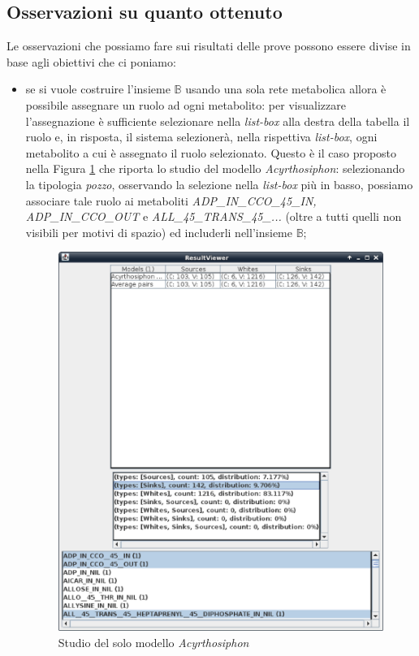 \subsection{Osservazioni su quanto ottenuto}
Le osservazioni che possiamo fare sui risultati delle prove possono
essere divise in base agli obiettivi che ci poniamo:
\begin{itemize}
\item se si vuole costruire l'insieme $\mathbb{B}$ usando una sola
  rete metabolica allora \`e possibile assegnare un ruolo ad ogni
  metabolito: per visualizzare l'assegnazione \`e sufficiente
  selezionare nella \emph{list-box} alla destra della tabella il ruolo
  e, in risposta, il sistema selezioner\`a, nella rispettiva
  \emph{list-box}, ogni metabolito a cui \`e assegnato il ruolo
  selezionato. Questo \`e il caso proposto nella Figura
  \ref{fig:ResultViewer-single-model} che riporta lo studio del
  modello \emph{Acyrthosiphon}: selezionando la tipologia
  \emph{pozzo}, osservando la selezione nella \emph{list-box} pi\`u in
  basso, possiamo associare tale ruolo ai metaboliti
  \emph{ADP\_IN\_CCO\_45\_IN, ADP\_IN\_CCO\_OUT} e
  \emph{ALL\_45\_TRANS\_45\_...} (oltre a tutti quelli non visibili
  per motivi di spazio) ed includerli nell'insieme $\mathbb{B}$;
  \begin{figure}
    \centering
    \includegraphics[scale=.6]{images/ResultViewer-single-model}
    \caption{Studio del solo modello \emph{Acyrthosiphon}}
    \label{fig:ResultViewer-single-model}
  \end{figure}


\end{itemize}
